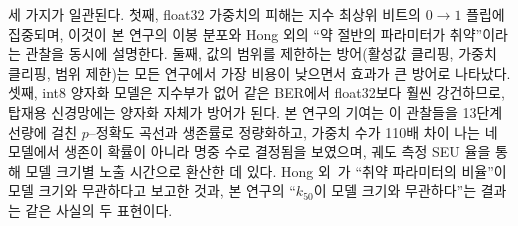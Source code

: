 \documentclass[11pt,a4paper]{article}
\begin{document}
세 가지가 일관된다. 첫째, float32 가중치의 피해는 지수 최상위 비트의 $0\to1$ 플립에 집중되며, 이것이 본 연구의 이봉 분포와 Hong 외의 ``약 절반의 파라미터가 취약''이라는 관찰을 동시에 설명한다. 둘째, 값의 범위를 제한하는 방어(활성값 클리핑, 가중치 클리핑, 범위 제한)는 모든 연구에서 가장 비용이 낮으면서 효과가 큰 방어로 나타났다. 셋째, int8 양자화 모델은 지수부가 없어 같은 BER에서 float32보다 훨씬 강건하므로, 탑재용 신경망에는 양자화 자체가 방어가 된다. 본 연구의 기여는 이 관찰들을 13단계 선량에 걸친 $p$--정확도 곡선과 생존률로 정량화하고, 가중치 수가 110배 차이 나는 네 모델에서 생존이 확률이 아니라 명중 수로 결정됨을 보였으며, 궤도 측정 SEU 율을 통해 모델 크기별 노출 시간으로 환산한 데 있다. Hong 외~\citep{hong2019}가 ``취약 파라미터의 비율''이 모델 크기와 무관하다고 보고한 것과, 본 연구의 ``$k_{50}$이 모델 크기와 무관하다''는 결과는 같은 사실의 두 표현이다.
\end{document}
